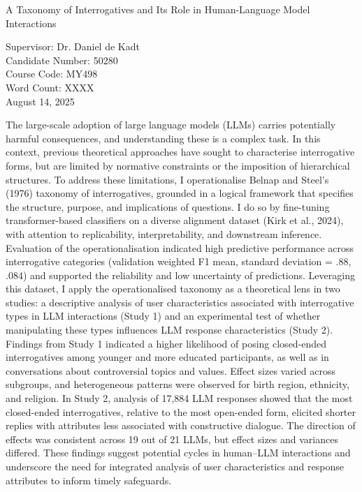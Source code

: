 \documentclass[
  12pt,
]{article}
\author{}
\date{\vspace{-2.5em}}
\begin{document}
\vspace*{1.5em}

\begin{center}
{\normalfont\LARGE
\begin{spacing}{1.5}
\begin{minipage}{0.85\textwidth}\centering
A Taxonomy of Interrogatives and Its Role in Human-Language Model Interactions
\end{minipage}
\end{spacing}
}

\vspace{3em} %

Supervisor: Dr. Daniel de Kadt\\
Candidate Number: 50280\\
Course Code: MY498\\
Word Count: XXXX\\
August 14, 2025
\end{center}

The large-scale adoption of large language models (LLMs) carries potentially harmful consequences, and understanding these is a complex task. In this context, previous theoretical approaches have sought to characterise interrogative forms, but are limited by normative constraints or the imposition of hierarchical structures. To address these limitations, I operationalise Belnap and Steel's (1976) taxonomy of interrogatives, grounded in a logical framework that specifies the structure, purpose, and implications of questions. I do so by fine-tuning transformer-based classifiers on a diverse alignment dataset (Kirk et al., 2024), with attention to replicability, interpretability, and downstream inference. Evaluation of the operationalisation indicated high predictive performance across interrogative categories (validation weighted F1 mean, standard deviation = .88, .084) and supported the reliability and low uncertainty of predictions. Leveraging this dataset, I apply the operationalised taxonomy as a theoretical lens in two studies: a descriptive analysis of user characteristics associated with interrogative types in LLM interactions (Study 1) and an experimental test of whether manipulating these types influences LLM response characteristics (Study 2). Findings from Study 1 indicated a higher likelihood of posing closed-ended interrogatives among younger and more educated participants, as well as in conversations about controversial topics and values. Effect sizes varied across subgroups, and heterogeneous patterns were observed for birth region, ethnicity, and religion. In Study 2, analysis of 17,884 LLM responses showed that the most closed-ended interrogatives, relative to the most open-ended form, elicited shorter replies with attributes less associated with constructive dialogue. The direction of effects was consistent across 19 out of 21 LLMs, but effect sizes and variances differed. These findings suggest potential cycles in human--LLM interactions and underscore the need for integrated analysis of user characteristics and response attributes to inform timely safeguards.
\end{document}
